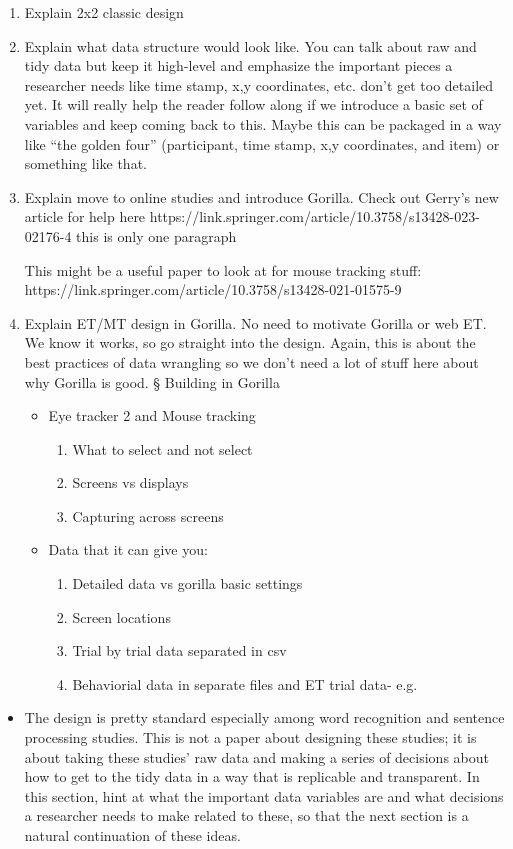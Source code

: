 \begin{enumerate}
\item Explain 2x2 classic design 
\item  Explain what data structure would look like. You can talk about raw and tidy data but keep it high-level and emphasize the important pieces a researcher needs like time stamp, x,y coordinates, etc. don’t get too detailed yet. It will really help the reader follow along if we introduce a basic set of variables and keep coming back to this. Maybe this can be packaged in a way like “the golden four” (participant, time stamp, x,y coordinates, and item) or something like that. 
\item   Explain move to online studies and introduce Gorilla. Check out Gerry’s new article for help here https://link.springer.com/article/10.3758/s13428-023-02176-4 this is only one paragraph

This might be a useful paper to look at for mouse tracking stuff:
https://link.springer.com/article/10.3758/s13428-021-01575-9

\item   Explain ET/MT design in Gorilla. No need to motivate Gorilla or web ET. We know it works, so go straight into the design. Again, this is about the best practices of data wrangling so we don’t need a lot of stuff here about why Gorilla is good. §  Building in Gorilla
\begin{itemize}
\item Eye tracker 2 and Mouse tracking
\begin{enumerate}
\item  What to select and not select
\item  Screens vs displays
\item  Capturing across screens
\end{enumerate}
\item Data that it can give you:
\begin{enumerate}
\item    Detailed data vs gorilla basic settings
\item   Screen locations
\item   Trial by trial data separated in csv
\item    Behaviorial data in separate files and ET trial data- e.g.
\end{enumerate}
\end{itemize}
\end{enumerate}

\begin{itemize}
\item The design is pretty standard especially among word recognition and sentence processing studies. This is not a paper about designing these studies; it is about taking these studies’ raw data and making a series of decisions about how to get to the tidy data in a way that is replicable and transparent. In this section, hint at what the important data variables are and what decisions a researcher needs to make related to these, so that the next section is a natural continuation of these ideas.
\end{itemize}

